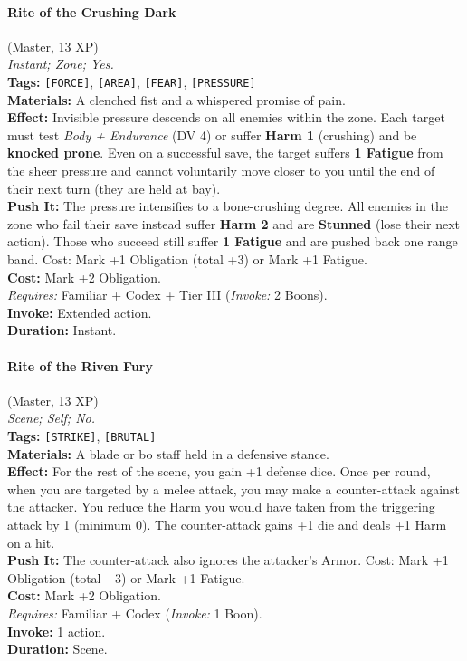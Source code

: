 \paragraph{Rite of the Crushing Dark} (Master, 13 XP) \hfill \\
\emph{Instant; Zone; Yes.} \\
\textbf{Tags:} \texttt{[FORCE]}, \texttt{[AREA]}, \texttt{[FEAR]}, \texttt{[PRESSURE]} \\
\textbf{Materials:} A clenched fist and a whispered promise of pain. \\
\textbf{Effect:} Invisible pressure descends on all enemies within the zone. Each target must test \textit{Body + Endurance} (DV 4) or suffer \textbf{Harm 1} (crushing) and be \textbf{knocked prone}. Even on a successful save, the target suffers \textbf{1 Fatigue} from the sheer pressure and cannot voluntarily move closer to you until the end of their next turn (they are held at bay). \\
\textbf{Push It:} The pressure intensifies to a bone-crushing degree. All enemies in the zone who fail their save instead suffer \textbf{Harm 2} and are \textbf{Stunned} (lose their next action). Those who succeed still suffer \textbf{1 Fatigue} and are pushed back one range band. Cost: Mark +1 Obligation (total +3) or Mark +1 Fatigue. \\
\textbf{Cost:} Mark +2 Obligation. \\
\textit{Requires:} Familiar + Codex + Tier III (\textit{Invoke:} 2 Boons). \\
\textbf{Invoke:} Extended action. \\
\textbf{Duration:} Instant.

\paragraph{Rite of the Riven Fury} (Master, 13 XP) \hfill \\
\emph{Scene; Self; No.} \\
\textbf{Tags:} \texttt{[STRIKE]}, \texttt{[BRUTAL]} \\
\textbf{Materials:} A blade or bo staff held in a defensive stance. \\
\textbf{Effect:} For the rest of the scene, you gain +1 defense dice. Once per round, when you are targeted by a melee attack, you may make a counter-attack against the attacker. You reduce the Harm you would have taken from the triggering attack by 1 (minimum 0). The counter-attack gains +1 die and deals +1 Harm on a hit. \\
\textbf{Push It:} The counter-attack also ignores the attacker's Armor. Cost: Mark +1 Obligation (total +3) or Mark +1 Fatigue. \\
\textbf{Cost:} Mark +2 Obligation. \\
\textit{Requires:} Familiar + Codex (\textit{Invoke:} 1 Boon). \\
\textbf{Invoke:} 1 action. \\
\textbf{Duration:} Scene.

